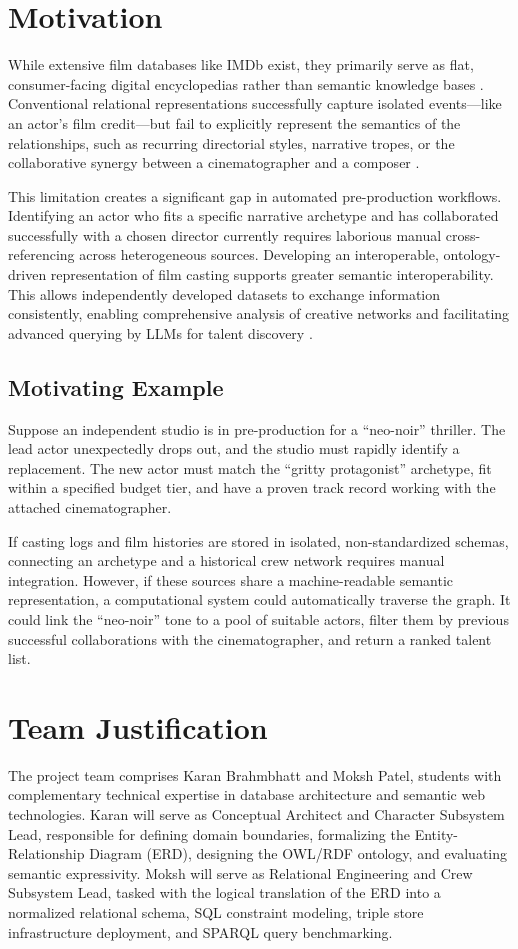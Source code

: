 \documentclass[sigconf]{acmart}
\begin{document}
\section{Motivation}
While extensive film databases like IMDb exist, they primarily serve as flat, consumer-facing digital encyclopedias rather than semantic knowledge bases \cite{hassanzadeh2009linkedmdb}. Conventional relational representations successfully capture isolated events—like an actor's film credit—but fail to explicitly represent the semantics of the relationships, such as recurring directorial styles, narrative tropes, or the collaborative synergy between a cinematographer and a composer \cite{bizer2011linked}. 

This limitation creates a significant gap in automated pre-production workflows. Identifying an actor who fits a specific narrative archetype and has collaborated successfully with a chosen director currently requires laborious manual cross-referencing across heterogeneous sources. Developing an interoperable, ontology-driven representation of film casting supports greater semantic interoperability. This allows independently developed datasets to exchange information consistently, enabling comprehensive analysis of creative networks and facilitating advanced querying by LLMs for talent discovery \cite{berners2001semantic}.

\subsection{Motivating Example}
Suppose an independent studio is in pre-production for a ``neo-noir'' thriller. The lead actor unexpectedly drops out, and the studio must rapidly identify a replacement. The new actor must match the ``gritty protagonist'' archetype, fit within a specified budget tier, and have a proven track record working with the attached cinematographer. 

If casting logs and film histories are stored in isolated, non-standardized schemas, connecting an archetype and a historical crew network requires manual integration. However, if these sources share a machine-readable semantic representation, a computational system could automatically traverse the graph. It could link the ``neo-noir'' tone to a pool of suitable actors, filter them by previous successful collaborations with the cinematographer, and return a ranked talent list.

\section{Team Justification}
The project team comprises Karan Brahmbhatt and Moksh Patel, students with complementary technical expertise in database architecture and semantic web technologies. Karan will serve as Conceptual Architect and Character Subsystem Lead, responsible for defining domain boundaries, formalizing the Entity-Relationship Diagram (ERD), designing the OWL/RDF ontology, and evaluating semantic expressivity. Moksh will serve as Relational Engineering and Crew Subsystem Lead, tasked with the logical translation of the ERD into a normalized relational schema, SQL constraint modeling, triple store infrastructure deployment, and SPARQL query benchmarking. 
\end{document}

